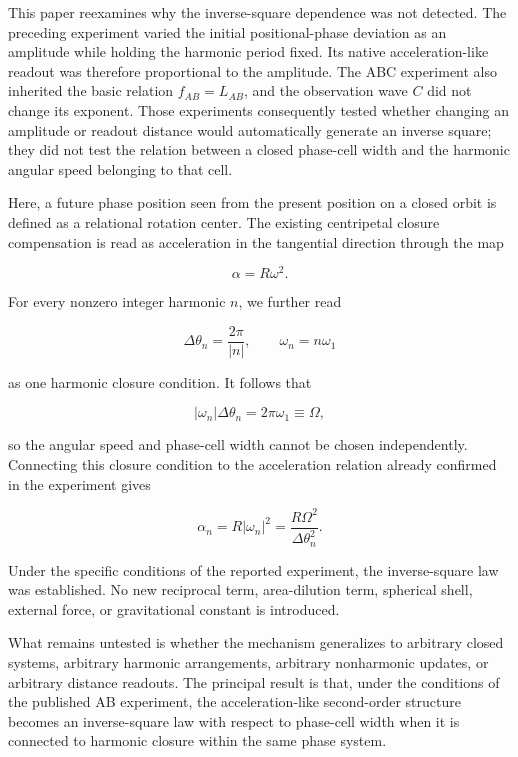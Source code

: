 \documentclass[
  a4paper,
]{article}
\begin{document}
This paper reexamines why the inverse-square dependence was not
detected. The preceding experiment varied the initial positional-phase
deviation as an amplitude while holding the harmonic period fixed. Its
native acceleration-like readout was therefore proportional to the
amplitude. The ABC experiment also inherited the basic relation
\(f_{AB}=L_{AB}\), and the observation wave \(C\) did not change its
exponent. Those experiments consequently tested whether changing an
amplitude or readout distance would automatically generate an inverse
square; they did not test the relation between a closed phase-cell width
and the harmonic angular speed belonging to that cell.

Here, a future phase position seen from the present position on a closed
orbit is defined as a relational rotation center. The existing
centripetal closure compensation is read as acceleration in the
tangential direction through the map

\[
\alpha=R\omega^2.
\]

For every nonzero integer harmonic \(n\), we further read

\[
\Delta\theta_n=\frac{2\pi}{|n|},
\qquad
\omega_n=n\omega_1
\]

as one harmonic closure condition. It follows that

\[
|\omega_n|\Delta\theta_n
=2\pi\omega_1
\equiv\Omega,
\]

so the angular speed and phase-cell width cannot be chosen
independently. Connecting this closure condition to the acceleration
relation already confirmed in the experiment gives

\[
\alpha_n
=R|\omega_n|^2
=\frac{R\Omega^2}{\Delta\theta_n^2}.
\]

Under the specific conditions of the reported experiment, the
inverse-square law was established. No new reciprocal term,
area-dilution term, spherical shell, external force, or gravitational
constant is introduced.

What remains untested is whether the mechanism generalizes to arbitrary
closed systems, arbitrary harmonic arrangements, arbitrary nonharmonic
updates, or arbitrary distance readouts. The principal result is that,
under the conditions of the published AB experiment, the
acceleration-like second-order structure becomes an inverse-square law
with respect to phase-cell width when it is connected to harmonic
closure within the same phase system.
\end{document}
